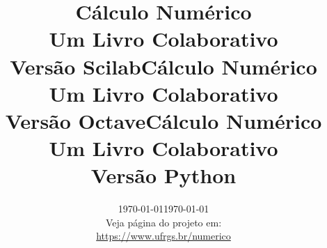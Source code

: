 \documentclass[12pt]{book}
\begin{document}
\frontmatter

\ifisscilab
\title{Cálculo Numérico\\\small{Um Livro Colaborativo}\\\small{Versão Scilab}}
\fi
\ifisoctave
\title{Cálculo Numérico\\\small{Um Livro Colaborativo}\\\small{Versão Octave}}
\fi
\ifispython
\title{Cálculo Numérico\\\small{Um Livro Colaborativo}\\\small{Versão Python}}
\fi
\author{}
\ifishtml
\date{\today}
\else
\date{\today\vspace{1cm}\\\small{Veja página do projeto em:\\
\url{https://www.ufrgs.br/numerico}
}
}
\fi
\ifishtml
\else
{}
\fi

\ifishtml
\else
\AddToShipoutPicture*{\BackgroundPic}
\fi
\maketitle






\ifisslide
\tableofcontents
\else
\ifishtml
\else
\tableofcontents
{}
\fi
\fi

\mainmatter







%




%

%




%
%




\ifisscilab
\appendix

\fi
\ifisoctave
\appendix

\fi
\ifispython
\appendix

\fi
\end{document}
